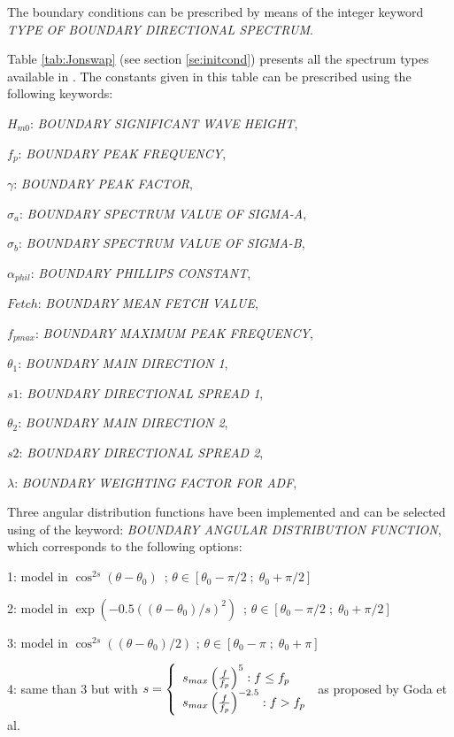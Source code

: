 The boundary conditions can be prescribed by means of the integer keyword \textit{TYPE OF BOUNDARY DIRECTIONAL SPECTRUM}.

 Table \ref{tab:Jonswap} (see section \ref{se:initcond}) presents all the spectrum types available in \tomawac. The constants given in this table can be prescribed using the following keywords:

  $H_{m0}$: \textit{BOUNDARY SIGNIFICANT WAVE HEIGHT},

 $f_p$:  \textit{BOUNDARY PEAK FREQUENCY},

 $\gamma$:  \textit{BOUNDARY PEAK FACTOR},

 $\sigma_a$:  \textit{BOUNDARY SPECTRUM VALUE OF SIGMA-A},

 $\sigma_b$:  \textit{BOUNDARY SPECTRUM VALUE OF SIGMA-B},

 $\alpha_{phil}$:  \textit{BOUNDARY PHILLIPS CONSTANT},

 $Fetch$:  \textit{BOUNDARY MEAN FETCH VALUE},

 $f_{pmax}$:  \textit{BOUNDARY MAXIMUM PEAK FREQUENCY},

 $\theta_1$:  \textit{BOUNDARY MAIN DIRECTION 1},

 $s1$:  \textit{BOUNDARY DIRECTIONAL SPREAD 1},

 $\theta_2$:  \textit{BOUNDARY MAIN DIRECTION 2},

 $s2$:  \textit{BOUNDARY DIRECTIONAL SPREAD 2},

 $\lambda$:  \textit{BOUNDARY WEIGHTING FACTOR FOR ADF},

 Three angular distribution functions have been implemented and can be selected using of the keyword: \textit{BOUNDARY ANGULAR DISTRIBUTION FUNCTION}, which corresponds to the following options:

 1:  model in $\cos ^{2s} (\theta -\theta _{0} )$~; $\theta \in \left[\theta _{0} -\pi /2\; ;\; \theta _{0} +\pi /2\right]$

 2:  model in $\exp \left(-0.5\left(\left(\theta -\theta _{0} \right)/s\right)^{2} \right)$~; $\theta \in \left[\theta _{0} -\pi /2\; ;\; \theta _{0} +\pi /2\right]$

 3:  model in $\cos ^{2s} \left(\left(\theta -\theta _{0} \right)/2\right)$ ; $\theta \in \left[\theta _{0} -\pi \; ;\; \theta _{0} +\pi \right]$  \cite{Mitsuyasu1975}

 4: same than 3 but with $ s=\left\{ \barr{l} s_{max} \left(\frac{f}{f_p} \right)^5 : f\le f_p \\
 s_{max} \left(\frac{f}{f_p} \right)^{-2.5} : f > f_p \earr\right. $ as proposed by Goda et al. \cite{Goda1975}
 

